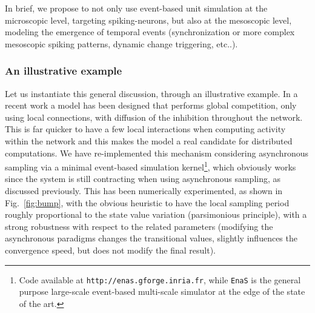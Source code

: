 In brief, we propose to not only use event-based unit simulation at the microscopic level, targeting spiking-neurons, but also at the mesoscopic level, modeling the emergence of temporal events (synchronization or more complex mesoscopic spiking patterns, dynamic change triggering, etc..).

\subsubsection*{An illustrative example}

Let us instantiate this general discussion, through an illustrative example. In a recent work \cite{Rougier:2006} a model has been designed that performs global competition, only using local connections, with diffusion of the inhibition throughout the network. This is far quicker to have a few local interactions when computing activity within the network and this makes the model a real candidate for distributed computations.
We have re-implemented this mechanism considering asynchronous sampling via a minimal event-based simulation 
kernel\footnote{Code available at {\tt http://enas.gforge.inria.fr},
while {\tt EnaS} is the general purpose large-scale event-based multi-scale simulator at the edge of the state of the art.},
which obviously works since the system is still contracting when using asynchronous sampling, as discussed previously. 
This has been numerically experimented, as shown in Fig.~\ref{fig:bump}, 
with the obvious heuristic to have the local sampling period roughly proportional to the state value variation (parsimonious principle),
with a strong robustness with respect to the related parameters (modifying the asynchronous paradigms changes the transitional values, slightly influences  the convergence speed, but does not modify the final result).

